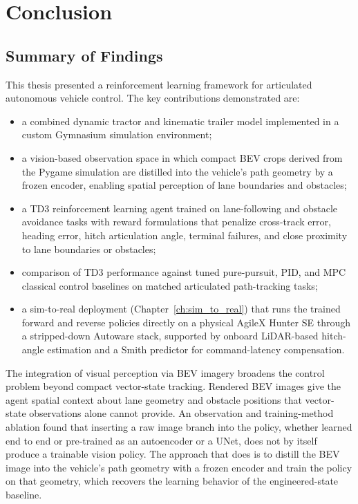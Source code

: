 \chapter{Conclusion}
\label{ch:conclusion}

\section{Summary of Findings}

This thesis presented a reinforcement learning framework for articulated autonomous vehicle control. The key contributions demonstrated are:
\begin{itemize}
    \item a combined dynamic tractor and kinematic trailer model implemented in a custom Gymnasium simulation environment;
    \item a vision-based observation space in which compact BEV crops derived from the Pygame simulation are distilled into the vehicle's path geometry by a frozen encoder, enabling spatial perception of lane boundaries and obstacles;
    \item a TD3 reinforcement learning agent trained on lane-following and obstacle avoidance tasks with reward formulations that penalize cross-track error, heading error, hitch articulation angle, terminal failures, and close proximity to lane boundaries or obstacles;
    \item comparison of TD3 performance against tuned pure-pursuit, PID, and MPC classical control baselines on matched articulated path-tracking tasks;
    \item a sim-to-real deployment (Chapter~\ref{ch:sim_to_real}) that runs the trained forward and reverse policies directly on a physical AgileX Hunter SE through a stripped-down Autoware stack, supported by onboard LiDAR-based hitch-angle estimation and a Smith predictor for command-latency compensation.
\end{itemize}

The integration of visual perception via BEV imagery broadens the control problem beyond compact vector-state tracking. Rendered BEV images give the agent spatial context about lane geometry and obstacle positions that vector-state observations alone cannot provide. An observation and training-method ablation found that inserting a raw image branch into the policy, whether learned end to end or pre-trained as an autoencoder or a UNet, does not by itself produce a trainable vision policy. The approach that does is to distill the BEV image into the vehicle's path geometry with a frozen encoder and train the policy on that geometry, which recovers the learning behavior of the engineered-state baseline.

